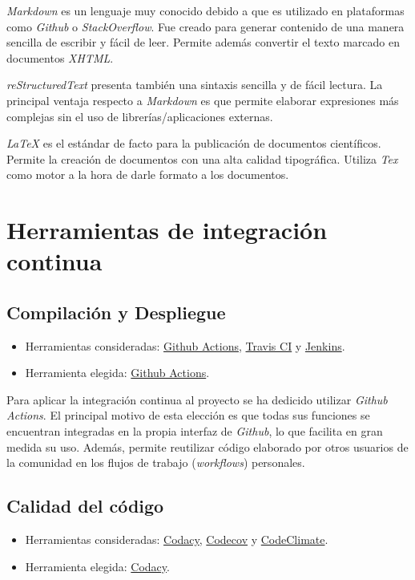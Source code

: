 \emph{Markdown} es un lenguaje muy conocido debido a que es utilizado en
plataformas como \emph{Github} o \emph{StackOverflow}. Fue creado para
generar contenido de una manera sencilla de escribir y fácil de leer.
Permite además convertir el texto marcado en documentos \emph{XHTML}.

\emph{reStructuredText} presenta también una sintaxis sencilla y de
fácil lectura. La principal ventaja respecto a \emph{Markdown} es que
permite elaborar expresiones más complejas sin el uso de
librerías/aplicaciones externas.

\emph{LaTeX} es el estándar de facto para la publicación de documentos
científicos. Permite la creación de documentos con una alta calidad
tipográfica. Utiliza \emph{Tex} como motor a la hora de darle formato a
los documentos.

\section{Herramientas de integración continua}

\subsection{Compilación y Despliegue}

\begin{itemize}
\tightlist
\item
  Herramientas consideradas:
  \href{https://github.com/features/actions}{Github Actions},
  \href{https://travis-ci.org/}{Travis CI} y
  \href{https://jenkins.io/}{Jenkins}.
\item
  Herramienta elegida: \href{https://github.com/features/actions}{Github
  Actions}.
\end{itemize}

Para aplicar la integración continua al proyecto se ha dedicido utilizar
\emph{Github Actions}. El principal motivo de esta elección es que todas
sus funciones se encuentran integradas en la propia interfaz de
\emph{Github}, lo que facilita en gran medida su uso. Además, permite
reutilizar código elaborado por otros usuarios de la comunidad en los
flujos de trabajo (\emph{workflows}) personales.

\subsection{Calidad del código}

\begin{itemize}
\tightlist
\item
  Herramientas consideradas: \href{https://codacy.com}{Codacy},
  \href{https://codecov.io/}{Codecov} y
  \href{https://codeclimate.com/}{CodeClimate}.
\item
  Herramienta elegida: \href{https://codacy.com}{Codacy}.
\end{itemize}

